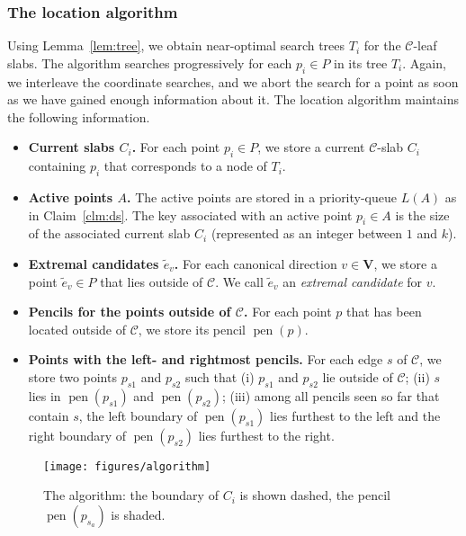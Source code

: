 \documentclass[letterpaper,11pt]{article}
\DeclareMathOperator{\pen}{pen}
\newcommand{\cC}{\mathcal{C}}
\begin{document}
\subsubsection{The location algorithm}
\label{sec:loc_alg}
Using Lemma~\ref{lem:tree},
we obtain near-optimal search trees 
$T_i$ for the $\cC$-leaf slabs. 
The algorithm searches progressively 
for each $p_i \in P$ in its 
tree $T_i$. Again, we interleave the
coordinate searches, and we abort the
search for a point as soon as we have 
gained enough information about
it. The location algorithm maintains 
the following information. 

\begin{itemize}
\item 
\textbf{Current slabs $C_i$.}
  For each point $p_i \in P$, 
  we store a current $\cC$-slab $C_i$ 
  containing $p_i$ that corresponds 
  to a node of $T_i$. 
\item \textbf{Active points $A$.}
  The active points are stored in a 
  priority-queue $L(A)$ as in 
  Claim~\ref{clm:ds}. The key associated 
  with an active point $p_i \in A$ is the size 
  of the associated current slab $C_i$ 
  (represented as an integer between $1$ and $k$).
\item \textbf{Extremal candidates $\tilde{e}_v$.}
  For each canonical direction 
  $v \in \textbf{V}$, we store a point
  $\tilde{e}_v \in P$ that lies outside 
  of $\cC$.  We call $\tilde{e}_v$ an 
  \emph{extremal candidate} for $v$.
\item
  \textbf{Pencils for the points outside of $\cC$.}
  For each point $p$ that has been 
  located outside of $\cC$, we store its
  pencil $\pen(p)$.
\item
  \textbf{Points with the left- and rightmost pencils.}
  For each edge $s$ of $\cC$, we store two  
  points $p_{s1}$
  and $p_{s2}$ such that 
  (i) $p_{s1}$ and $p_{s2}$ lie outside of $\cC$;  
  (ii) $s$ lies in $\pen(p_{s1})$ and $\pen(p_{s2})$;
  (iii) among all pencils seen 
  so far that contain $s$, the left boundary of 
  $\pen(p_{s1})$  lies furthest to the left 
  and the right boundary of $\pen(p_{s2})$  
  lies furthest to the right. 
\end{itemize}

\begin{figure}
  \centering
  \texttt{[image: figures/algorithm]}
  \caption{The algorithm:  the boundary 
  of $C_i$ is shown dashed, the pencil 
  $\pen(p_{s_a})$ is shaded.}
  \label{fig:algorithm}
\end{figure}
\end{document}
